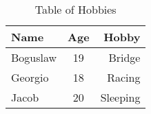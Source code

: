\begin{table}[]
    \centering
    \begin{tabular}{l|c|r}
         \hline
         Name     & Age & Hobby\\
         \hline
         Boguslaw & 19  & Bridge\\
         \hline
         Georgio  & 18  & Racing\\
         \hline
         Jacob    & 20  & Sleeping\\
         \hline
    \end{tabular}
    \caption{Table of Hobbies}
    \label{tab:my_label}
\end{table}